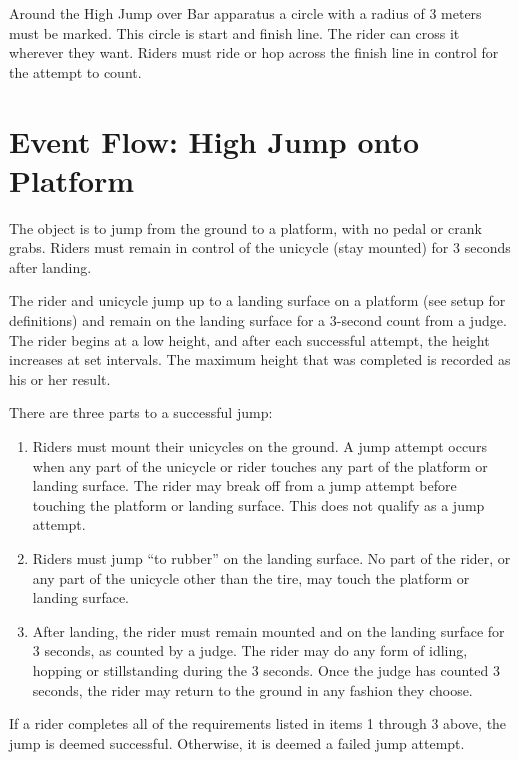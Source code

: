 Around the High Jump over Bar apparatus a circle with a radius of 3 meters must be marked.
This circle is start and finish line.
The rider can cross it wherever they want.
Riders must ride or hop across the finish line in control for the attempt to count.

\section{Event Flow: High Jump onto Platform}
The object is to jump from the ground to a platform, with no pedal or crank grabs.
Riders must remain in control of the unicycle (stay mounted) for 3 seconds after landing.

The rider and unicycle jump up to a landing surface on a platform (see setup for definitions) and remain on the landing surface for a 3-second count from a judge.
The rider begins at a low height, and after each successful attempt, the height increases at set intervals.
The maximum height that was completed is recorded as his or her result.

There are three parts to a successful jump:
\begin{enumerate}
\item Riders must mount their unicycles on the ground.
A jump attempt occurs when any part of the unicycle or rider touches any part of the platform or landing surface.
The rider may break off from a jump attempt before touching the platform or landing surface.
This does not qualify as a jump attempt.
\item Riders must jump ``to rubber'' on the landing surface.
No part of the rider, or any part of the unicycle other than the tire, may touch the platform or landing surface.
\item After landing, the rider must remain mounted and on the landing surface for 3 seconds, as counted by a judge.
The rider may do any form of idling, hopping or stillstanding during the 3 seconds.
Once the judge has counted 3 seconds, the rider may return to the ground in any fashion they choose.
\end{enumerate}
If a rider completes all of the requirements listed in items 1 through 3 above, the jump is deemed successful.
Otherwise, it is deemed a failed jump attempt.

